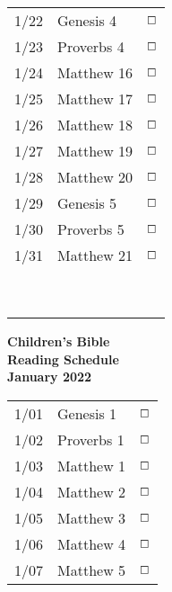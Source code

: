 \documentclass[10pt,landscape,letterpaper]{article}
\begin{document}
\begin{multicols}{5}
\begin{tabular}{p{0.3in}p{0.75in}p{0.4in}}
1/22 & \textcolor[rgb]{0.98,0.00,0.00}{Genesis 4} & \textcolor[rgb]{0.98,0.00,0.00}{$\boxempty$} \\
1/23 & \textcolor[rgb]{0.98,0.00,0.00}{Proverbs 4} & \textcolor[rgb]{0.98,0.00,0.00}{$\boxempty$} \\
1/24 & Matthew 16 & $\boxempty$ \\
1/25 & Matthew 17 & $\boxempty$ \\
1/26 & Matthew 18 & $\boxempty$ \\
1/27 & Matthew 19 & $\boxempty$ \\
1/28 & Matthew 20 & $\boxempty$ \\

1/29 & \textcolor[rgb]{0.98,0.00,0.00}{Genesis 5} & \textcolor[rgb]{0.98,0.00,0.00}{$\boxempty$} \\
1/30 & \textcolor[rgb]{0.98,0.00,0.00}{Proverbs 5} & \textcolor[rgb]{0.98,0.00,0.00}{$\boxempty$} \\
1/31 & Matthew 21 & $\boxempty$ \\
 &  &  \\
 &  &  \\
 &  &  \\
 &  &  \\
 &  &  \\
 &  &  \\
 &  &  \\
 &  &  \\
 &  &  \\

\end{tabular}

\begin{center}
\textbf{Children's Bible\\
Reading Schedule\\January 2022}
\end{center}

\begin{tabular}{p{0.3in}p{0.75in}p{0.4in}}
1/01 & \textcolor[rgb]{0.98,0.00,0.00}{Genesis 1} & \textcolor[rgb]{0.98,0.00,0.00}{$\boxempty$} \\
1/02 & \textcolor[rgb]{0.98,0.00,0.00}{Proverbs 1} & \textcolor[rgb]{0.98,0.00,0.00}{$\boxempty$} \\
1/03 & Matthew 1 & $\boxempty$ \\
1/04 & Matthew 2 & $\boxempty$ \\
1/05 & Matthew 3 & $\boxempty$ \\
1/06 & Matthew 4 & $\boxempty$ \\
1/07 & Matthew 5 & $\boxempty$ \\


\end{tabular}
\end{multicols}
\end{document}
